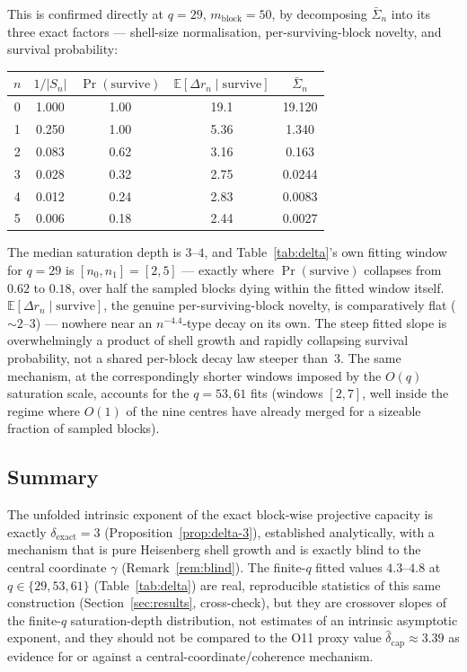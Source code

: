     This is confirmed directly at $q=29$, $m_{\mathrm{block}}=50$, by decomposing
    $\bar{\Sigma}_n$ into its three exact factors — shell-size normalisation, per-surviving-block
    novelty, and survival probability:
    \begin{center}
      \begin{tabular}{ccccc}
        \hline
        $n$ & $1/|S_n|$ & $\Pr(\text{survive})$ & $\mathbb{E}[\Delta r_n\mid\text{survive}]$ & $\bar{\Sigma}_n$ \\
        \hline
        0 & 1.000  & 1.00 & 19.1 & 19.120  \\
        1 & 0.250  & 1.00 & 5.36 & 1.340   \\
        2 & 0.083  & 0.62 & 3.16 & 0.163   \\
        3 & 0.028  & 0.32 & 2.75 & 0.0244  \\
        4 & 0.012  & 0.24 & 2.83 & 0.0083  \\
        5 & 0.006  & 0.18 & 2.44 & 0.0027  \\
        \hline
      \end{tabular}
    \end{center}
    The median saturation depth is $3$--$4$, and Table~\ref{tab:delta}'s own fitting window
    for $q=29$ is $[n_0,n_1]=[2,5]$ — exactly where $\Pr(\text{survive})$ collapses from
    $0.62$ to $0.18$, over half the sampled blocks dying within the fitted window itself.
    $\mathbb{E}[\Delta r_n\mid\text{survive}]$, the genuine per-surviving-block novelty, is
    comparatively flat ($\sim 2$--$3$) — nowhere near an $n^{-4.4}$-type decay on its own.
    The steep fitted slope is overwhelmingly a product of shell growth and rapidly collapsing
    survival probability, not a shared per-block decay law steeper than~$3$.
    The same mechanism, at the correspondingly shorter windows imposed by the $O(q)$
    saturation scale, accounts for the $q=53,61$ fits (windows $[2,7]$, well inside the
    regime where $O(1)$ of the nine centres have already merged for a sizeable fraction of
    sampled blocks).

  \subsection{Summary}

    The unfolded intrinsic exponent of the exact block-wise projective capacity is exactly
    $\delta_{\mathrm{exact}}=3$ (Proposition~\ref{prop:delta-3}), established analytically, with
    a mechanism that is pure Heisenberg shell growth and is exactly blind to the central
    coordinate $\gamma$ (Remark~\ref{rem:blind}).
    The finite-$q$ fitted values $4.3$--$4.8$ at $q\in\{29,53,61\}$ (Table~\ref{tab:delta}) are
    real, reproducible statistics of this same construction (Section~\ref{sec:results},
    cross-check), but they are crossover slopes of the finite-$q$ saturation-depth
    distribution, not estimates of an intrinsic asymptotic exponent, and they should not be
    compared to the O11 proxy value $\hat{\delta}_{\mathrm{cap}}\approx 3.39$ as evidence for
    or against a central-coordinate/coherence mechanism.

